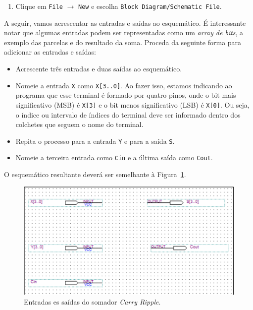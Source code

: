 \documentclass[12pt,a4paper]{article}
\begin{document}
\begin{enumerate}
    \item Clique em \texttt{File} $\rightarrow$ \texttt{New} e escolha \texttt{Block Diagram/Schematic File}.
\end{enumerate}

A seguir, vamos acrescentar as entradas e saídas ao esquemático. É interessante notar que algumas entradas podem ser representadas como um \textit{array de bits}, a exemplo das parcelas e do resultado da soma. Proceda da seguinte forma para adicionar as entradas e saídas:

\begin{itemize}
    \item Acrescente três entradas e duas saídas ao esquemático.
    \item Nomeie a entrada \texttt{X} como \texttt{X[3..0]}. Ao fazer isso, estamos indicando ao programa que esse terminal é formado por quatro pinos, onde o bit mais significativo (MSB) é \texttt{X[3]} e o bit menos significativo (LSB) é \texttt{X[0]}. Ou seja, o índice ou intervalo de índices do terminal deve ser informado dentro dos colchetes que seguem o nome do terminal.
    \item Repita o processo para a entrada \texttt{Y} e para a saída \texttt{S}.
    \item Nomeie a terceira entrada como \texttt{Cin} e a última saída como \texttt{Cout}.
\end{itemize}

O esquemático resultante deverá ser semelhante à Figura~\ref{fig:carryRipplePins}.

\begin{figure}[htbp!]
    \centering
    \includegraphics[width=\textwidth]{./figs/carryRipplePins.png}
    \caption{Entradas es saídas do somador \textit{Carry Ripple}.}
    \label{fig:carryRipplePins}
\end{figure}
\end{document}
